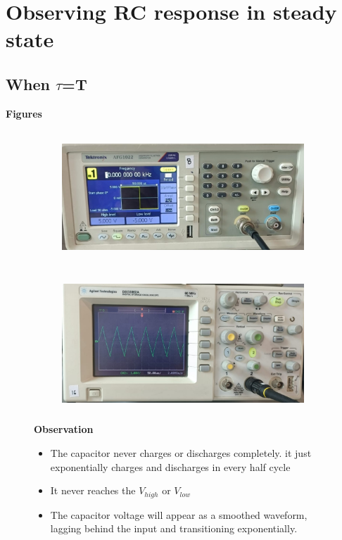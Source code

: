 \documentclass[a4paper,12pt]{article}
\begin{document}
\section{Observing RC response in steady state}
\subsection{When $\tau$=T}
\begin{itemize}
    \item \textbf{Figures}
    \begin{figure}[H]
    \centering
    \begin{subfigure}{0.48\textwidth}
        \centering
        \includegraphics[height=5cm]{figs/inputrc==t.jpeg}
    \end{subfigure}
    \hspace{0.04\textwidth} %
    \begin{subfigure}{0.48\textwidth}
        \centering
        \includegraphics[height=5cm]{figs/outputrc==t.jpeg}
    \end{subfigure}
    \item \textbf{Observation}
    \begin{itemize}
        \item The capacitor never charges or discharges completely. it just exponentially charges and discharges in every half cycle
        \item It never reaches the $V_{high}$ or $V_{low}$
        \item The capacitor voltage will appear as a smoothed waveform, lagging behind the input and transitioning exponentially.
    \end{itemize}
\end{figure}
\end{itemize}
\newpage
\end{document}
